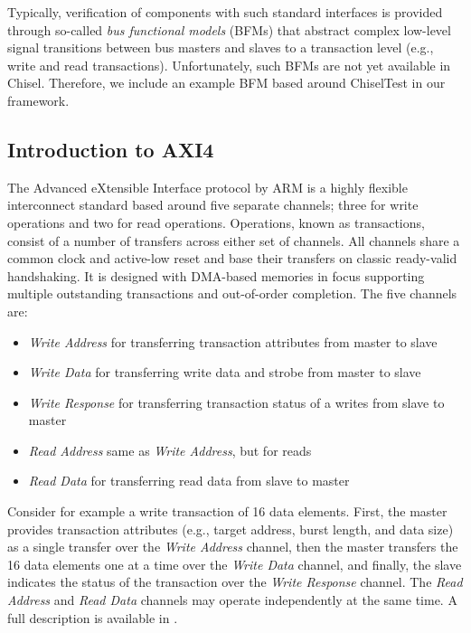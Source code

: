 \documentclass[runningheads]{llncs}
\begin{document}
Typically, verification of components with such standard interfaces is provided through so-called \textit{bus functional models} (BFMs) that abstract complex low-level signal transitions between bus masters and slaves to a transaction level (e.g., write and read transactions). Unfortunately, such BFMs are not yet available in Chisel. Therefore, we include an example BFM based around ChiselTest in our framework.

\subsection{Introduction to AXI4}
The Advanced eXtensible Interface protocol by ARM is a highly flexible interconnect standard based around five separate channels; three for write operations and two for read operations. Operations, known as transactions, consist of a number of transfers across either set of channels. All channels share a common clock and active-low reset and base their transfers on classic ready-valid handshaking. It is designed with DMA-based memories in focus supporting multiple outstanding transactions and out-of-order completion. The five channels are:
\begin{itemize}
  \item \textit{Write Address} for transferring transaction attributes from master to slave
  \item \textit{Write Data} for transferring write data and strobe from master to slave
  \item \textit{Write Response} for transferring transaction status of a writes from slave to master
  \item \textit{Read Address} same as \textit{Write Address}, but for reads
  \item \textit{Read Data} for transferring read data from slave to master
\end{itemize}

Consider for example a write transaction of 16 data elements. First, the master provides transaction attributes (e.g., target address, burst length, and data size) as a single transfer over the \textit{Write Address} channel, then the master transfers the 16 data elements one at a time over the \textit{Write Data} channel, and finally, the slave indicates the status of the transaction over the \textit{Write Response} channel. The \textit{Read Address} and \textit{Read Data} channels may operate independently at the same time. A full description is available in \cite{axi4standard}. %
\end{document}
